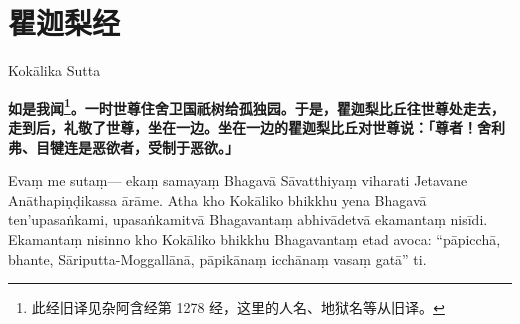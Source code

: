 \section{瞿迦梨经}

\begin{center}Kokālika Sutta\end{center}\vspace{1em}

\textbf{如是我闻\footnote{此经旧译见杂阿含经第 1278 经，这里的人名、地狱名等从旧译。}。一时世尊住舍卫国祇树给孤独园。于是，瞿迦梨比丘往世尊处走去，走到后，礼敬了世尊，坐在一边。坐在一边的瞿迦梨比丘对世尊说：「尊者！舍利弗、目犍连是恶欲者，受制于恶欲。」}

Evaṃ me sutaṃ— ekaṃ samayaṃ Bhagavā Sāvatthiyaṃ viharati Jetavane Anāthapiṇḍikassa ārāme. Atha kho Kokāliko bhikkhu yena Bhagavā ten’upasaṅkami, upasaṅkamitvā Bhagavantaṃ abhivādetvā ekamantaṃ nisīdi. Ekamantaṃ nisinno kho Kokāliko bhikkhu Bhagavantaṃ etad avoca: “pāpicchā, bhante, Sāriputta-Moggallānā, pāpikānaṃ icchānaṃ vasaṃ gatā” ti.

